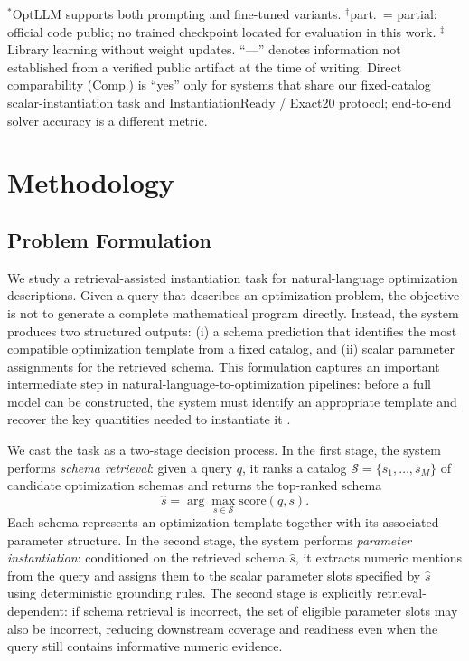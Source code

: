 \documentclass[pdflatex,sn-basic,Numbered]{sn-jnl}
\begin{document}
\begin{table}[t]
\vspace{1mm}
\raggedright
\footnotesize
$^{*}$OptLLM supports both prompting and fine-tuned variants.
$^{\dagger}$part.\ = partial: official code public; no trained checkpoint located for evaluation in this work.
$^{\ddagger}$Library learning without weight updates.
``---'' denotes information not established from a verified public artifact at the time of writing.
Direct comparability (Comp.) is ``yes'' only for systems that share our fixed-catalog scalar-instantiation
task and InstantiationReady / Exact20 protocol; end-to-end solver accuracy is a different metric.
\end{table}

\section{Methodology}
\label{sec:method}

\subsection{Problem Formulation}
\label{subsec:method_problem}

We study a retrieval-assisted instantiation task for natural-language optimization descriptions. Given a query that describes an optimization problem, the objective is not to generate a complete mathematical program directly. Instead, the system produces two structured outputs: (i) a schema prediction that identifies the most compatible optimization template from a fixed catalog, and (ii) scalar parameter assignments for the retrieved schema. This formulation captures an important intermediate step in natural-language-to-optimization pipelines: before a full model can be constructed, the system must identify an appropriate template and recover the key quantities needed to instantiate it \cite{nlp4lp_dataset,ramamonjison2023nl4opt,ahmaditeshnizi2024optimus_icml}.

We cast the task as a two-stage decision process. In the first stage, the system performs \emph{schema retrieval}: given a query $q$, it ranks a catalog $\mathcal{S}=\{s_1,\dots,s_M\}$ of candidate optimization schemas and returns the top-ranked schema
\begin{equation}
\hat{s}=\arg\max_{s \in \mathcal{S}} \mathrm{score}(q,s).
\label{eq:top1_schema}
\end{equation}
Each schema represents an optimization template together with its associated parameter structure. In the second stage, the system performs \emph{parameter instantiation}: conditioned on the retrieved schema $\hat{s}$, it extracts numeric mentions from the query and assigns them to the scalar parameter slots specified by $\hat{s}$ using deterministic grounding rules. The second stage is explicitly retrieval-dependent: if schema retrieval is incorrect, the set of eligible parameter slots may also be incorrect, reducing downstream coverage and readiness even when the query still contains informative numeric evidence.
\end{document}
